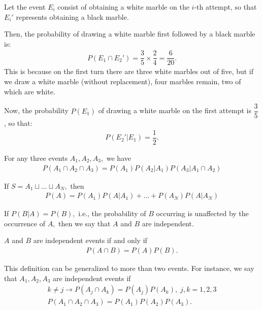 \begin{solution}
	Let the event $ E_i $ consist of obtaining a white marble on the $i$-th attempt, so that $ E_i' $ represents obtaining a black marble. 
	
	Then, the probability of drawing a white marble first followed by a black marble is:
	\begin{align}
		P(E_1\cap E_2') = \dfrac{3}{5}\times \dfrac{2}{4}=\dfrac{6}{20}.
	\end{align}
	This is because on the first turn there are three white marbles out of five, but if we draw a white marble (without replacement), four marbles remain, two of which are white. 
	
	Now, the probability $ P(E_1) $ of drawing a white marble on the first attempt is $ \dfrac{3}{5} $, so that:
	\begin{align}
		P(E_2'|E_1) = \dfrac{1}{2}.
	\end{align}
\end{solution}





{}
\begin{theorem}
	\label{thm:2.4.1}
	For any three events $A_{1},A_{2},A_{3},$ we have
	\begin{align}
		\label{eq:2.4.1}
		P(A_{1} \cap A_{2} \cap A_{3})=P(A_{1})P(A_{2}|A_{1})P(A_{3}|A_{1} \cap A_{2})
	\end{align}
\end{theorem}


{}
\begin{theorem}
	\label{thm:2.4.2} If $S=A_{1}\sqcup ... \sqcup A_{N},$ then
	\begin{align}
		\label{eq:2.4.2}
		P(A)=P(A_{1})P(A|A_{1})+...+P(A_{N})P(A|A_{N})
	\end{align}
\end{theorem}


{}
If $P(B|A)=P(B),$ i.e., the probability of $B$ occurring is unaffected by the occurrence of $A,$ then we say that $A$ and $B$ are independent.


\begin{definition}
	$A$ and $B$ are independent events if and only if
	\begin{align}
		\label{eq:2.4.3}
		P(A \cap B) = P(A)P(B).
	\end{align}
\end{definition}


{}
This definition can be generalized to more than two events. For instance, we say that $A_{1},A_{2},A_{3}$ are independent events if
\begin{align}
	k\neq j \rightarrow P(A_{j} \cap A_{k})=P(A_{j})P(A_{k}), \; j,k=1,2,3 
	\\ P(A_{1}\cap A_{2} \cap A_{3})=P(A_{1})P(A_{2})P(A_{3}).
\end{align}


%	
